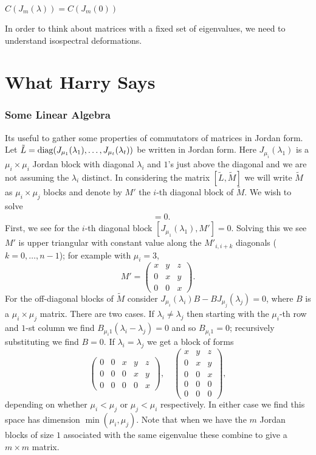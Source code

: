 \documentclass{article}
\begin{document}
\begin{prop}
	$C(J_m(\lambda)) = C(J_m(0))$
\end{prop}
In order to think about matrices with a fixed set of eigenvalues, we need to understand isospectral deformations. 








\section{What Harry Says}



\subsubsection{Some Linear Algebra}

Its useful to gather some properties of commutators of matrices in Jordan form. Let
$\tilde L=\operatorname{diag}(J_{\mu_1}(\lambda_1),\ldots, J_{\mu_t}(\lambda_t) )$ be written in Jordan form. Here
$J_{\mu_i}(\lambda_1)$ is a $\mu_i\times\mu_i$ Jordan block with diagonal $\lambda_i$ and $1$'s just 
above the diagonal and we are not assuming the $\lambda_i$ distinct. In considering the matrix
$[{\tilde L},{\tilde M}]$ we will write $\tilde M$ as $\mu_i\times \mu_j$ blocks and denote by $M'$ the $i$-th diagonal block of $\tilde M$. We wish to solve
\begin{align}
[{\tilde L},{\tilde M}]&=0.
\end{align}
First, we
see for the $i$-th diagonal block $[J_{\mu_1}(\lambda_1),M']=0$. Solving this we see $M'$ is upper triangular with constant value along the $M'_{i,i+k}$ diagonals ($k=0,\dots,n-1$); for example with $\mu_i=3$,
$$M'=\begin{pmatrix}x&y&z\\ 0&x&y\\ 0&0&x \end{pmatrix}.$$
For the off-diagonal blocks of $\tilde M$ consider $J_{\mu_i}(\lambda_i)B-
B J_{\mu_j}(\lambda_j)=0$, where $B$ is a $\mu_i\times \mu_j$ matrix. There are two cases.
If $\lambda_i\ne \lambda_j$ then starting with the $\mu_i$-th row and $1$-st column we find
$B_{\mu_i1}(\lambda_i- \lambda_j)=0$ and so $B_{\mu_i1}=0$; recursively substituting we find
$B=0$. If $\lambda_i= \lambda_j$ we get a block of forms
$$\begin{pmatrix}0&0&x&y&z\\ 0&0&0&x&y\\ 0&0&0&0&x \end{pmatrix},\quad
\begin{pmatrix}x&y&z\\ 0&x&y\\ 0&0&x\\ 0&0&0\\  0&0&0\end{pmatrix},
$$
depending on whether $\mu_i<\mu_j$ or $\mu_j<\mu_i$ respectively. 
In either case we find this space has dimension $\min(\mu_i,\mu_j)$.
Note that when we have the
$m$ Jordan blocks of size $1$ associated with the same eigenvalue these combine to give a $m\times m$ matrix.
\end{document}
